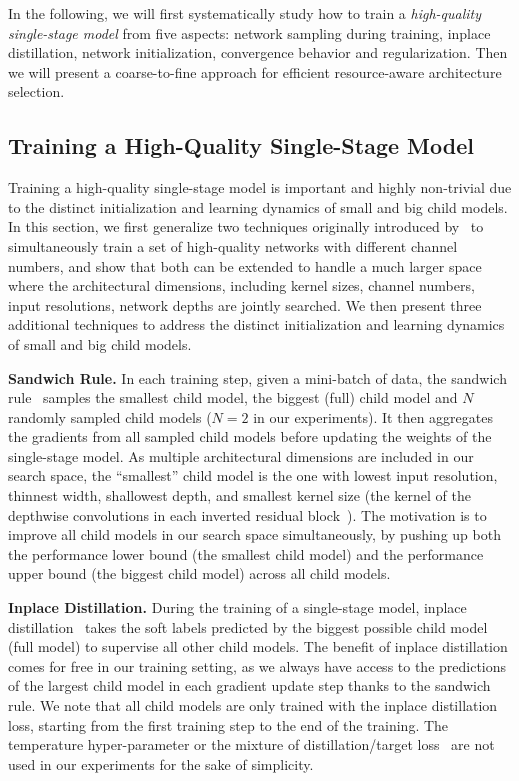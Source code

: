 \documentclass[runningheads]{llncs}
\begin{document}
In the following, we will first systematically study how to train a \emph{high-quality single-stage model} from five aspects: network sampling during training, inplace distillation, network initialization,  convergence behavior and regularization. Then we will present a coarse-to-fine approach for efficient resource-aware architecture selection.

\subsection{Training a High-Quality Single-Stage Model}\label{secs:train_one_stage}
Training a high-quality single-stage model is important and highly non-trivial due to the distinct initialization and learning dynamics of small and big child models. In this section, we first generalize two techniques originally introduced by~\cite{yu2019universally} to simultaneously train a set of high-quality networks with different channel numbers, and show that both can be extended to handle a much larger space where the architectural dimensions, including kernel sizes, channel numbers, input resolutions, network depths are jointly searched. We then present three additional techniques to address the distinct initialization and learning dynamics of small and big child models.

\textbf{Sandwich Rule.} In each training step, given a mini-batch of data, the sandwich rule~\cite{yu2019universally} samples the smallest child model, the biggest (full) child model and $N$ randomly sampled child models ($N=2$ in our experiments). It then aggregates the gradients from all sampled child models before updating the weights of the single-stage model. As multiple architectural dimensions are included in our search space, the ``smallest'' child model is the one with lowest input resolution, thinnest width, shallowest depth, and smallest kernel size (the kernel of the depthwise convolutions in each inverted residual block~\cite{sandler2018inverted}). The motivation is to improve all child models in our search space simultaneously, by pushing up both the performance lower bound (the smallest child model) and the performance upper bound (the biggest child model) across all child models.

\textbf{Inplace Distillation.} During the training of a single-stage model, inplace distillation~\cite{yu2019universally} takes the soft labels predicted by the biggest possible child model (full model) to supervise all other child models. The benefit of inplace distillation comes for free in our training setting, as we always have access to the predictions of the largest child model in each gradient update step thanks to the sandwich rule. We note that all child models are only trained with the inplace distillation loss, starting from the first training step to the end of the training. The temperature hyper-parameter or the mixture of distillation/target loss~\cite{hinton2015distilling} are not used in our experiments for the sake of simplicity.
\end{document}
